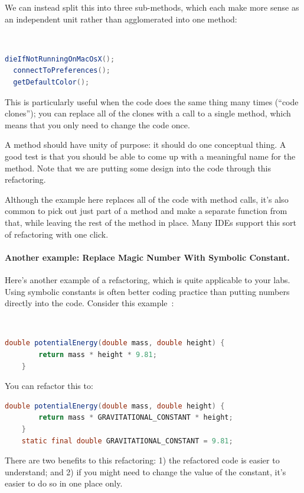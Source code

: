 We can instead split this into three sub-methods, which each make more
sense as an independent unit rather than agglomerated into one method:

{\tt
\begin{lstlisting}[language=Java]
  dieIfNotRunningOnMacOsX();
  connectToPreferences();
  getDefaultColor();
\end{lstlisting}
}

This is particularly useful when the code does the same thing 
many times (``code clones''); you can replace all of the clones with
a call to a single method, which means that you only need to change the
code once. 

A method should have unity of purpose: it should do one
conceptual thing. A good test is that you should be able to come up
with a meaningful name for the method. Note that we are putting some
design into the code through this refactoring.

Although the example here replaces all of the code with method calls,
it's also common to pick out just part of a method and make a separate
function from that, while leaving the rest of the method in
place. Many IDEs support this sort of refactoring with one click.

\paragraph{Another example: Replace Magic Number With Symbolic Constant.}
Here's another example of a refactoring, which is quite applicable to
your labs. Using symbolic constants is often better coding practice
than putting numbers directly into the code. Consider this example~\cite{ref:repconst}:

{\tt
\begin{lstlisting}[language=Java]
	double potentialEnergy(double mass, double height) {
		return mass * height * 9.81;
	}
\end{lstlisting}}

You can refactor this to:
{\tt \begin{lstlisting}[language=Java]
	double potentialEnergy(double mass, double height) {
		return mass * GRAVITATIONAL_CONSTANT * height;
	}
	static final double GRAVITATIONAL_CONSTANT = 9.81;
\end{lstlisting}}
\vspace{-1em}
There are two benefits to this refactoring: 1) the refactored code is
easier to understand; and 2) if you might need to change the value of 
the constant, it's easier to do so in one place only.
\vspace{-1em}

